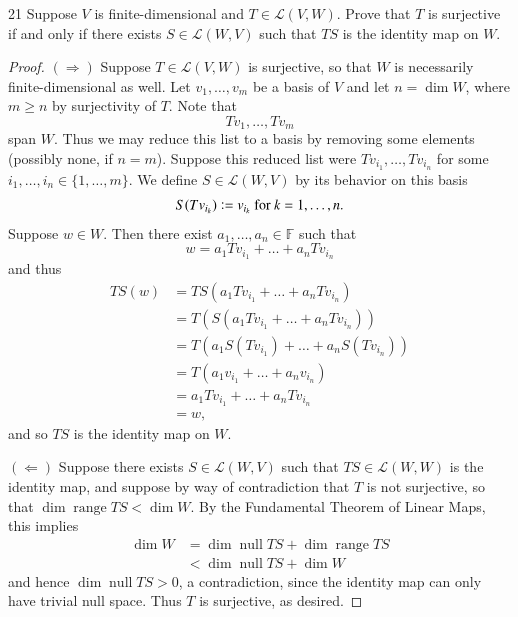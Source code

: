 \documentclass{extarticle}
\newenvironment{problem}[1]{\begin{prob*}{#1}{}}{\end{prob*}}
\newcommand{\F}{\mathbb{F}}
\newcommand{\Hom}{\mathcal{L}}
\DeclareMathOperator{\Null}{null}
\DeclareMathOperator{\Range}{range}
\newcommand{\defeq}{\vcentcolon=}
\begin{document}
\begin{problem}{21}
Suppose $V$ is finite-dimensional and $T\in\Hom(V,W)$.  Prove that $T$ is surjective if and only if there exists $S\in\Hom(W,V)$ such that $TS$ is the identity map on $W$.  
\end{problem}
\begin{proof}
$(\Rightarrow)$  Suppose $T\in\Hom(V,W)$ is surjective, so that $W$ is necessarily finite-dimensional as well.  Let $v_1,\dots, v_m$ be a basis of $V$ and let $n=\dim W$, where $m\geq n $ by surjectivity of $T$.  Note that
\begin{equation*}
Tv_1,\dots, Tv_m
\end{equation*}
span $W$.  Thus we may reduce this list to a basis by removing some elements (possibly none, if $n = m$).  Suppose this reduced list were $Tv_{i_1},\dots, Tv_{i_n}$ for some $i_1,\dots, i_n\in\{1,\dots, m\}$.  We define $S\in\Hom(W,V)$ by its behavior on this basis
\begin{align*}
S(Tv_{i_k}) \defeq v_{i_k} \text{ for }k = 1,\dots, n.
\end{align*}
Suppose $w \in W$.  Then there exist $a_1,\dots, a_n\in\F$ such that
\begin{equation*}
w = a_1 Tv_{i_1} + \dots + a_nTv_{i_n}
\end{equation*}
and thus
\begin{align*}
TS(w) &= TS\left(a_1 Tv_{i_1} + \dots + a_nTv_{i_n}\right)\\
&= T\left(S\left( a_1 Tv_{i_1} + \dots + a_nTv_{i_n}\right)\right)\\
&= T\left( a_1 S(Tv_{i_1}) + \dots + a_nS(Tv_{i_n})\right)\\
&= T(a_1 v_{i_1} + \dots + a_nv_{i_n})\\
&= a_1 Tv_{i_1} + \dots + a_nTv_{i_n}\\
&= w,
\end{align*}
and so $TS$ is the identity map on $W$.
\par $(\Leftarrow)$ Suppose there exists $S\in\Hom(W,V)$ such that $TS\in\Hom(W,W)$ is the identity map, and suppose by way of contradiction that $T$ is not surjective, so that $\dim \Range TS < \dim W$.  By the Fundamental Theorem of Linear Maps, this implies
\begin{align*}
\dim W &= \dim\Null TS + \dim \Range TS\\
&< \dim\Null TS + \dim W
\end{align*}
and hence $\dim\Null TS > 0$, a contradiction, since the identity map can only have trivial null space.  Thus $T$ is surjective, as desired.
\end{proof}
\end{document}
